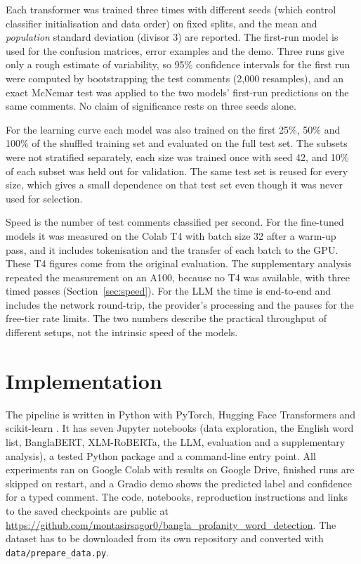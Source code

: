 Each transformer was trained three times with different seeds (which control classifier initialisation and data order) on fixed splits, and the mean and \emph{population} standard deviation (divisor 3) are reported. The first-run model is used for the confusion matrices, error examples and the demo. Three runs give only a rough estimate of variability, so 95\% confidence intervals for the first run were computed by bootstrapping the test comments (2,000 resamples), and an exact McNemar test was applied to the two models' first-run predictions on the same comments. No claim of significance rests on three seeds alone.

For the learning curve each model was also trained on the first 25\%, 50\% and 100\% of the shuffled training set and evaluated on the full test set. The subsets were not stratified separately, each size was trained once with seed 42, and 10\% of each subset was held out for validation. The same test set is reused for every size, which gives a small dependence on that test set even though it was never used for selection.

Speed is the number of test comments classified per second. For the fine-tuned models it was measured on the Colab T4 with batch size 32 after a warm-up pass, and it includes tokenisation and the transfer of each batch to the GPU. These T4 figures come from the original evaluation. The supplementary analysis repeated the measurement on an A100, because no T4 was available, with three timed passes (Section~\ref{sec:speed}). For the LLM the time is end-to-end and includes the network round-trip, the provider's processing and the pauses for the free-tier rate limits. The two numbers describe the practical throughput of different setups, not the intrinsic speed of the models.

\section{Implementation}

The pipeline is written in Python with PyTorch, Hugging Face Transformers \cite{wolf2020transformers} and scikit-learn \cite{pedregosa2011sklearn}. It has seven Jupyter notebooks (data exploration, the English word list, BanglaBERT, XLM-RoBERTa, the LLM, evaluation and a supplementary analysis), a tested Python package and a command-line entry point. All experiments ran on Google Colab with results on Google Drive, finished runs are skipped on restart, and a Gradio demo shows the predicted label and confidence for a typed comment. The code, notebooks, reproduction instructions and links to the saved checkpoints are public at \url{https://github.com/montasirsagor0/bangla_profanity_word_detection}. The dataset has to be downloaded from its own repository and converted with \texttt{data/prepare\_data.py}.
